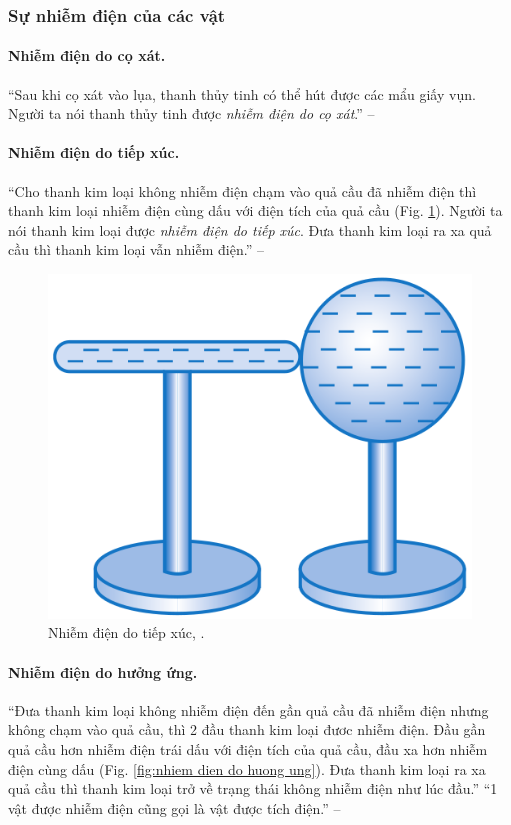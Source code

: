 \documentclass[oneside]{book}
\numberwithin{equation}{section}
\begin{document}
\subsubsection{Sự nhiễm điện của các vật}

\paragraph{Nhiễm điện do cọ xát.} ``Sau khi cọ xát vào lụa, thanh thủy tinh có thể hút được các mẩu giấy vụn. Người ta nói thanh thủy tinh được \textit{nhiễm điện do cọ xát}.'' -- \cite[p. 6]{SGK_Vat_Ly_11_nang_cao}

\paragraph{Nhiễm điện do tiếp xúc.} ``Cho thanh kim loại không nhiễm điện chạm vào quả cầu đã nhiễm điện thì thanh kim loại nhiễm điện cùng dấu với điện tích của quả cầu (Fig. \ref{fig:nhiem dien do tiep xuc}). Người ta nói thanh kim loại được \textit{nhiễm điện do tiếp xúc}. Đưa thanh kim loại ra xa quả cầu thì thanh kim loại vẫn nhiễm điện.'' -- \cite[p. 7]{SGK_Vat_Ly_11_nang_cao}

\begin{figure}[H]
	\centering
	\includegraphics[scale=0.15]{nhiem_dien_do_tiep_xuc}
	\caption{Nhiễm điện do tiếp xúc, \cite[Hình 1.3, p. 7]{SGK_Vat_Ly_11_nang_cao}.}
	\label{fig:nhiem dien do tiep xuc}
\end{figure}

\paragraph{Nhiễm điện do hưởng ứng.} ``Đưa thanh kim loại không nhiễm điện đến gần quả cầu đã nhiễm điện nhưng không chạm vào quả cầu, thì 2 đầu thanh kim loại đươc nhiễm điện. Đầu gần quả cầu hơn nhiễm điện trái dấu với điện tích của quả cầu, đầu xa hơn nhiễm điện cùng dấu (Fig. \ref{fig:nhiem dien do huong ung}). Đưa thanh kim loại ra xa quả cầu thì thanh kim loại trở về trạng thái không nhiễm điện như lúc đầu.'' ``1 vật được nhiễm điện cũng gọi là vật được tích điện.'' -- \cite[p. 7]{SGK_Vat_Ly_11_nang_cao}
\end{document}
